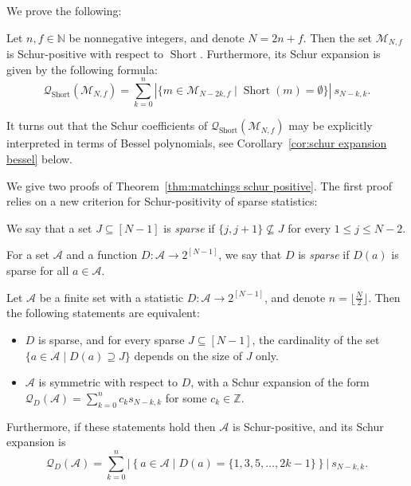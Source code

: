 \documentclass[ALCO]{cedram}
\newcommand{\Short}{\operatorname{Short}}
\newcommand{\ZZ}{\mathbb{Z}}
\newcommand{\NN}{\mathbb{N}}
\newcommand{\Q}{\mathcal{Q}}
\newcommand{\A}{\mathcal{A}}
\newcommand{\M}{\mathcal{M}}
\begin{document}
We prove the following:
\begin{theorem}
\label{thm:matchings schur positive}
    Let $n,f \in \NN$ be nonnegative integers, and denote $N=2n+f$. Then the set $\M_{N,f}$ is Schur-positive with respect to $\Short$. Furthermore, its Schur expansion is given by the following formula:
    \[
        \Q_{\Short} (\M_{N,f}) = \sum_{k=0}^n |\{ m\in \M_{N-2k,f} \mid \Short(m) = \emptyset\}|\ s_{N-k,k}.
    \]
\end{theorem}

It turns out  that the Schur coefficients of $\Q_{\Short} (\M_{N,f})$ 
may be explicitly interpreted in terms of Bessel polynomials, see 
Corollary~\ref{cor:schur expansion bessel} 
below.




We give two proofs of Theorem~\ref{thm:matchings schur positive}. The first proof relies on a new criterion for Schur-positivity of sparse statistics:

\begin{definition}
\label{def:sparse}
    We say that a set $J \subseteq [N-1]$ is \emph{sparse} if $\{j,j+1\} \nsubseteq J$ for every $1 \le j \le N-2$.

    For a set $\A$ and a function $D:\A \to 2^{[N-1]}$, we say that $D$ is \emph{sparse} if $D(a)$ is sparse for all $a \in \A$.
\end{definition}

\begin{theorem}
\label{thm:criterion schur positive two rows}
    Let $\A$ be a finite set with a statistic $D:\A \to 2^{[N-1]}$, and denote $n = \lfloor\frac{N}{2} \rfloor$. Then the following statements are equivalent:
    \begin{itemize}
        \item $D$ is sparse, and for every sparse $J \subseteq [N-1]$, the cardinality of the set $\{a \in \A \mid D(a) \supseteq J\}$ depends on the size of $J$ only.
        \item $\A$ is symmetric with respect to $D$, with a Schur expansion of the form $\Q_{D}(\A) = \sum_{k=0}^n c_k s_{N-k,k}$ for some $c_k \in \ZZ$.
    \end{itemize}

    Furthermore, if these statements hold then $\A$ is Schur-positive, and its Schur expansion is
    \[
        \Q_{D} (\A) = \sum_{k=0}^n \left|\left\{ a\in \A \mid D(a) = \{1,3,5,\dots, 2k-1\} \right\}\right|\: s_{N-k,k}.
    \]
    
\end{theorem}
\end{document}
